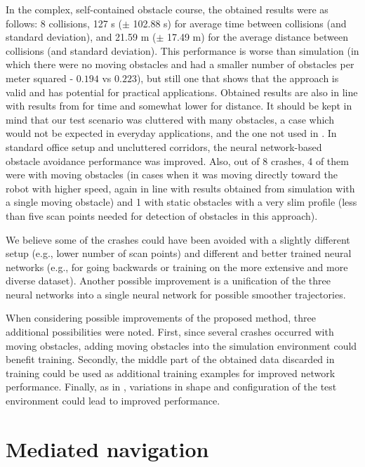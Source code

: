 In the complex, self-contained obstacle course, the obtained results were as follows: 8 collisions, 127 s ($\pm$ 102.88 s) for average time between collisions (and standard deviation), and 21.59 m ($\pm$ 17.49 m) for the average distance between collisions (and standard deviation). This performance is worse than simulation (in which there were no moving obstacles and had a smaller number of obstacles per meter squared - $0.194$ vs $0.223$), but still one that shows that the approach is valid and has potential for practical applications. Obtained results are also in line with results from \cite{Gandhi2017} for time and somewhat lower for distance. It should be kept in mind that our test scenario was cluttered with many obstacles, a case which would not be expected in everyday applications, and the one not used in \cite{Gandhi2017}. In standard office setup and uncluttered corridors, the neural network-based obstacle avoidance performance was improved. Also, out of 8 crashes, 4 of them were with moving obstacles (in cases when it was moving directly toward the robot with higher speed, again in line with results obtained from simulation with a single moving obstacle) and 1 with static obstacles with a very slim profile (less than five scan points needed for detection of obstacles in this approach). 

We believe some of the crashes could have been avoided with a slightly different setup (e.g., lower number of scan points) and different and better trained neural networks (e.g., for going backwards or training on the more extensive and more diverse dataset). Another possible improvement is a unification of the three neural networks into a single neural network for possible smoother trajectories. 

When considering possible improvements of the proposed method, three additional possibilities were noted. First, since several crashes occurred with moving obstacles, adding moving obstacles into the simulation environment could benefit training. Secondly, the middle part of the obtained data discarded in training could be used as additional training examples for improved network performance. Finally, as in \cite{Zhu2017}, variations in shape and configuration of the test environment could lead to improved performance.


\section{Mediated navigation}\label{sec:ResMediation}

